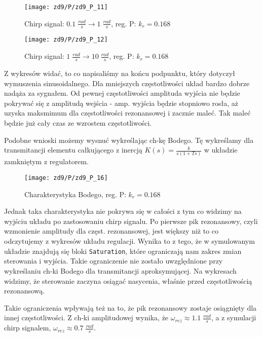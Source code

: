 \documentclass[11 pt]{article}
\begin{document}
\begin{figure}[h!]
	\centerline{
	\texttt{[image: zd9/P/zd9\_P\_11]}
	}
	\caption{Chirp signal: $0.1 \; \frac{rad}{s} \rightarrow 1 \; \frac{rad}{s}$, reg. P: $k_r = 0.168$}
\end{figure}

\begin{figure}[h!]
	\centerline{
	\texttt{[image: zd9/P/zd9\_P\_12]}
	}
	\caption{Chirp signal: $1 \; \frac{rad}{s} \rightarrow 10 \; \frac{rad}{s}$, reg. P: $k_r = 0.168$}
\end{figure}

\newpage

Z wykresów widać, to co napisaliśmy na końcu podpunktu, który dotyczył wymuszenia sinusoidalnego. Dla mniejszych częstotliwości układ bardzo dobrze nadąża za sygnałem. Od pewnej częstotliwości amplituda wyjścia nie będzie pokrywać się z amplitudą wejścia - amp. wyjścia będzie stopniowo rosła, aż uzyska maksmimum dla częstotliwości rezonansowej i zacznie maleć. Tak maleć będzie już cały czas ze wzrostem częstotliwości.

Podobne wnioski możemy wysnuć wykreślając ch-kę Bodego. Tę wykreślamy dla transmitancji elementu całkującego z inercją $K(s) = \displaystyle \frac{k}{s(1 + Ts)}$ w układzie zamkniętym z regulatorem.

\begin{figure}[h!]
	\centerline{
	\texttt{[image: zd9/P/zd9\_P\_16]}
	}
	\caption{Charakterystyka Bodego, reg. P: $k_r = 0.168$}
\end{figure}

Jednak taka charakterystyka nie pokrywa się w całości z tym co widzimy na wyjściu układu po zastosowaniu chirp signalu. Po pierwsze pik rezonansowy, czyli wzmonienie amplitudy dla częst. rezonansowej, jest większy niż to co odczytujemy z wykresów układu regulacji. Wynika to z tego, że w symulowanym układzie znajdują się bloki \texttt{Saturation}, które ograniczają nam zakres zmian sterowania i wyjścia. Takie ograniczenie nie zostało uwzględnione przy wykreślaniu ch-ki Bodego dla transmitancji aproksymującej. Na wykresach widzimy, że sterowanie zaczyna osiągać nasycenia, właśnie przed częstotliwością rezonansową.

Takie ograniczenia wpływają też na to, że pik rezonansowy zostaje osiągnięty dla innej częstotliwości. Z ch-ki amplitudowej wynika, że $\omega_{rez} \approx 1.1 \; \frac{rad}{s}$, a z symulacji chirp signalem, $\omega_{rez} \approx 0.7 \; \frac{rad}{s}$.
\end{document}
